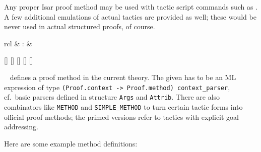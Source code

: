 \begin{isabellebody}
\begin{isamarkuptext}
  Any proper Isar proof method may be used with tactic script commands
  such as \hyperlink{command.apply}{\mbox{}}.  A few additional emulations of actual
  tactics are provided as well; these would be never used in actual
  structured proofs, of course.%
\end{isamarkuptext}%
\isamarkuptrue%
%
\isamarkuptrue%
%
\begin{isamarkuptext}%
\begin{matharray}{rcl}
    \hypertarget{command.method-setup}{\hyperlink{command.method-setup}{\mbox{}}} & : &  \\
  \end{matharray}

  \begin{railoutput}
[]
[]
[]
[]
\rail@bar
{}
[]
\rail@endbar
\rail@end
\end{railoutput}


  \begin{description}

  \item \hyperlink{command.method-setup}{\mbox{}}~
  defines a proof method in the current theory.  The given  has to be an ML expression of type
  \verb|(Proof.context -> Proof.method) context_parser|, cf.\
  basic parsers defined in structure \verb|Args| and \verb|Attrib|.  There are also combinators like \verb|METHOD| and \verb|SIMPLE_METHOD| to turn certain tactic forms into official proof
  methods; the primed versions refer to tactics with explicit goal
  addressing.

  Here are some example method definitions:


\end{description}
\end{isamarkuptext}
\end{isabellebody}

